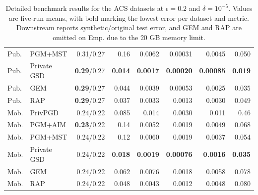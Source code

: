 \begin{table}[!tbp]
{\begin{tabular}{llrrrrrr}
    Pub. & PGM+MST & 0.31/0.27 & 0.16 & 0.0062 & 0.00031 & 0.0045 & 0.050 \\
    Pub. & Private GSD & \textbf{0.29}/0.27 & \textbf{0.014} & \textbf{0.0017} & \textbf{0.00020} & \textbf{0.00085} & \textbf{0.019} \\
    Pub. & GEM & \textbf{0.29}/0.27 & 0.044 & 0.0039 & 0.00053 & 0.0025 & 0.035 \\
    Pub. & RAP & \textbf{0.29}/0.27 & 0.037 & 0.0033 & 0.0013 & 0.0030 & 0.049 \\
    \midrule
    Mob. & PrivPGD & 0.24/0.22 & 0.085 & 0.014 & 0.0030 & 0.011 & 0.46 \\
    Mob. & PGM+AIM & \textbf{0.23}/0.22 & 0.14 & 0.0052 & 0.0019 & 0.0049 & 0.068 \\
    Mob. & PGM+MST & 0.24/0.22 & 0.12 & 0.0060 & 0.0019 & 0.0037 & 0.054 \\
    Mob. & Private GSD & 0.24/0.22 & \textbf{0.018} & \textbf{0.0019} & \textbf{0.00076} & \textbf{0.0016} & \textbf{0.035} \\
    Mob. & GEM & 0.24/0.22 & 0.062 & 0.0076 & 0.0018 & 0.0058 & 0.078 \\
    Mob. & RAP & 0.24/0.22 & 0.048 & 0.0043 & 0.0012 & 0.0048 & 0.080 \\
    \bottomrule
  \end{tabular}}
  \caption{Detailed benchmark results for the ACS datasets at \(\epsilon = 0.2\) and \(\delta = 10^{-5}\). Values are five-run means, with bold marking the lowest error per dataset and metric. Downstream reports synthetic/original test error, and GEM and RAP are omitted on Emp. due to the \(20\) GB memory limit.}
  \label{tab:app-privpgd-e02-acs}
\end{table}

